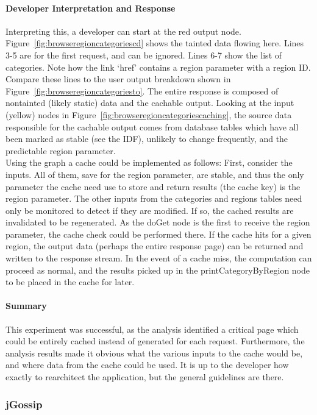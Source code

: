 \documentclass[msc,oneside]{ubcthesis}
\begin{document}
\paragraph{Developer Interpretation and Response}
Interpreting this, a developer can start at the red output node. Figure~\ref{fig:browseregioncategoriescd} shows the tainted data flowing here. Lines 3-5 are for the first request, and can be ignored. Lines 6-7 show the list of categories. Note how the link `href' contains a region parameter with a region ID. Compare these lines to the user output breakdown shown in Figure~\ref{fig:browseregioncategoriesto}. The entire response is composed of nontainted (likely static) data and the cachable output. Looking at the input (yellow) nodes in Figure~\ref{fig:browseregioncategoriescaching}, the source data responsible for the cachable output comes from database tables which have all been marked as stable (see the IDF), unlikely to change frequently, and the predictable region parameter. \\

Using the graph a cache could be implemented as follows: First, consider the inputs. All of them, save for the region parameter, are stable, and thus the only parameter the cache need use to store and return results (the cache key) is the region parameter. The other inputs from the categories and regions tables need only be monitored to detect if they are modified. If so, the cached results are invalidated to be regenerated. As the doGet node is the first to receive the region parameter, the cache check could be performed there. If the cache hits for a given region, the output data (perhaps the entire response page) can be returned and written to the response stream. In the event of a cache miss, the computation can proceed as normal, and the results picked up in the printCategoryByRegion node to be placed in the cache for later.

\paragraph{Summary}
This experiment was successful, as the analysis identified a critical page which could be entirely cached instead of generated for each request. Furthermore, the analysis results made it obvious what the various inputs to the cache would be, and where data from the cache could be used. It is up to the developer how exactly to rearchitect the application, but the general guidelines are there.

\subsubsection{jGossip} 
\label{sec:jcaching}
\end{document}
